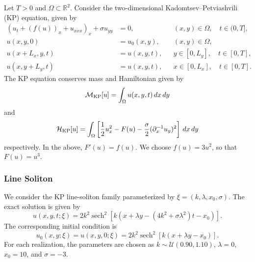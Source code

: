 \documentclass[11pt,a4paper]{article}
\DeclareMathOperator{\sech}{sech}
\theoremstyle{definition}
\theoremstyle{remark}
\numberwithin{equation}{section}
\numberwithin{figure}{section}
\numberwithin{table}{section}
\begin{document}
Let $T>0$ and $\Omega\subset\mathbb{R}^2$. Consider the two-dimensional Kadomtsev--Petviashvili (KP) equation, given by
\begin{equation}
\begin{aligned}
\left(u_t+(f(u))_x+u_{xxx}\right)_x+\sigma u_{yy} &= 0,
&& (x,y)\in\Omega,\quad t\in(0,T],\\
u(x,y,0) &= u_0(x,y),
&& (x,y)\in\Omega,\\
u(x+L_x,y,t) &= u(x,y,t),
&& y\in[0,L_y],\quad t\in[0,T],\\
u(x,y+L_y,t) &= u(x,y,t),
&& x\in[0,L_x],\quad t\in[0,T].
\end{aligned}
\label{eq:kp_equation_fno_style}
\end{equation}
The KP equation conserves mass and Hamiltonian given by 
\begin{equation}
    \mathcal M_{\rm KP}[u]=\int_{\Omega}u(x,y,t)\,dx\,dy
\end{equation}
and 
\begin{equation}
    \mathcal H_{\rm KP}[u]=\int_{\Omega}
\left[\frac12u_x^2-F(u)-\frac{\sigma}{2}
(\partial_x^{-1}u_y)^2\right]\,dx\,dy
\end{equation}
respectively. In the above, $F'(u)=f(u)$. %
We choose $f(u)=3u^2$, so that $F(u)=u^3$. 

\subsubsection*{Line Soliton}
We consider the KP line-soliton family parameterized by
\(\xi=(k,\lambda,x_0,\sigma)\). The exact solution is given by
\begin{equation}
    u(x,y,t;\xi)
    =
    2k^2
    \sech^2
    \left[
        k
        \left(
            x+\lambda y
            -
            (4k^2+\sigma\lambda^2)t
            -
            x_0
        \right)
    \right].
    \label{eq:kp_line_solution_family}
\end{equation}
The corresponding initial condition is
\begin{equation}
    u_0(x,y;\xi)
    =
    u(x,y,0;\xi)
    =
    2k^2
    \sech^2
    \left[
        k(x+\lambda y-x_0)
    \right].
    \label{eq:kp_line_ic_family}
\end{equation}
For each realization, the parameters are chosen as
\(k\sim \mathcal U(0.90,1.10)\), \(\lambda=0\), \(x_0=10\), and
\(\sigma=-3\).
\end{document}
